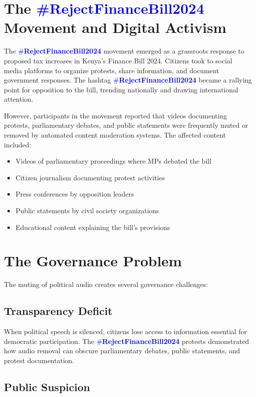 \documentclass{article}
\newcommand{\rejectbill}{\textcolor{blue}{\#\textbf{RejectFinanceBill2024}}}
\begin{document}
\section{The \rejectbill{} Movement and Digital Activism}

The \rejectbill{} movement emerged as a grassroots response to proposed tax increases in Kenya's Finance Bill 2024. Citizens took to social media platforms to organize protests, share information, and document government responses. The hashtag \rejectbill{} became a rallying point for opposition to the bill, trending nationally and drawing international attention.

However, participants in the movement reported that videos documenting protests, parliamentary debates, and public statements were frequently muted or removed by automated content moderation systems. The affected content included:

\begin{itemize}
\item Videos of parliamentary proceedings where MPs debated the bill
\item Citizen journalism documenting protest activities
\item Press conferences by opposition leaders
\item Public statements by civil society organizations
\item Educational content explaining the bill's provisions
\end{itemize}

\section{The Governance Problem}

The muting of political audio creates several governance challenges:

\subsection{Transparency Deficit}

When political speech is silenced, citizens lose access to information essential for democratic participation. The \rejectbill{} protests demonstrated how audio removal can obscure parliamentary debates, public statements, and protest documentation.

\subsection{Public Suspicion}
\end{document}
